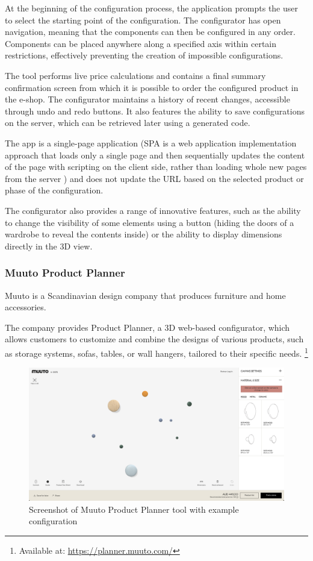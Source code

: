 At the beginning of the configuration process, the application prompts the user to select the starting point of the configuration. The configurator has open navigation, meaning that the components can then be configured in any order. Components can be placed anywhere along a specified axis within certain restrictions, effectively preventing the creation of impossible configurations.

The tool performs live price calculations and contains a final summary confirmation screen from which it is possible to order the configured product in the e-shop. The configurator maintains a history of recent changes, accessible through undo and redo buttons. It also features the ability to save configurations on the server, which can be retrieved later using a generated code.

The app is a single-page application (SPA is a web application implementation approach that loads only a single page and then sequentially updates the content of the page with scripting on the client side, rather than loading whole new pages from the server \cite{Fink2014}) and does not update the URL based on the selected product or phase of the configuration.

The configurator also provides a range of innovative features, such as the ability to change the visibility of some elements using a button (hiding the doors of a wardrobe to reveal the contents inside) or the ability to display dimensions directly in the 3D view.


\subsubsection{Muuto Product Planner}

Muuto is a Scandinavian design company that produces furniture and home accessories. \cite{Muuto}

The company provides Product Planner, a 3D web-based configurator, which allows customers to customize and combine the designs of various products, such as storage systems, sofas, tables, or wall hangers, tailored to their specific needs. \footnote{Available at: \url{https://planner.muuto.com/}}

\begin{figure}[h]
\centering
\includegraphics[width=\textwidth]{images/analysis_muuto-product-planner.png}
\caption{Screenshot of Muuto Product Planner tool with example configuration}
\end{figure}

